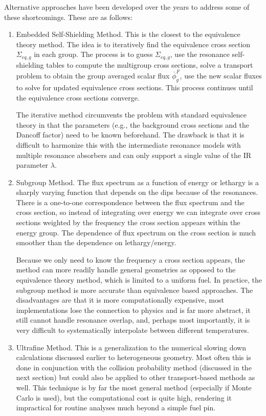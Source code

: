 Alternative approaches have been developed over the years to address some of these shortcomings. These are as follows:
\begin{enumerate}
  \item Embedded Self-Shielding Method. This is the closest to the equivalence theory method. The idea is to iteratively find the equivalence cross section $\Sigma_{eq,g}$ in each group. The process is to guess $\Sigma_{eq,g}$, use the resonance self-shielding tables to compute the multigroup cross sections, solve a transport problem to obtain the group averaged scalar flux $\overline{\phi}^F_g$, use the new scalar fluxes to solve for updated equivalence cross sections. This process continues until the equivalence cross sections converge. 
  
  The iterative method circumvents the problem with standard equivalence theory in that the parameters (e.g., the background cross sections and the Dancoff factor) need to be known beforehand. The drawback is that it is difficult to harmonize this with the intermediate resonance models with multiple resonance absorbers and can only support a single value of the IR parameter $\lambda$. 
  
  \item Subgroup Method. The flux spectrum as a function of energy or lethargy is a sharply varying function that depends on the dips because of the resonances. There is a one-to-one correspondence between the flux spectrum and the cross section, so instead of integrating over energy we can integrate over cross sections weighted by the frequency the cross section appears within the energy group. The dependence of flux spectrum on the cross section is much smoother than the dependence on lethargy/energy. 
  
  Because we only need to know the frequency a cross section appears, the method can more readily handle general geometries as opposed to the equivalence theory method, which is limited to a uniform fuel. In practice, the subgroup method is more accurate than equivalence based approaches. The disadvantages are that it is more computationally expensive, most implementations lose the connection to physics and is far more abstract, it still cannot handle resonance overlap, and, perhaps most importantly, it is very difficult to systematically interpolate between different temperatures.
  
  \item Ultrafine Method. This is a generalization to the numerical slowing down calculations discussed earlier to heterogeneous geometry. Most often this is done in conjunction with the collision probability method (discussed in the next section) but could also be applied to other transport-based methods as well. This technique is by far the most general method (especially if Monte Carlo is used), but the computational cost is quite high, rendering it impractical for routine analyses much beyond a simple fuel pin.
\end{enumerate}

